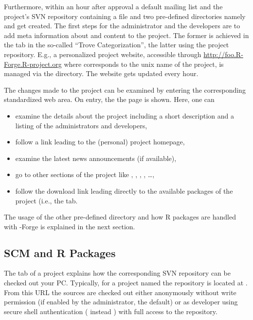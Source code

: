 Furthermore, within an hour after approval a default mailing list and
the project's SVN repository containing a  file and two
pre-defined directories namely  and  get
created. The first steps for the administrator and the developers
are to add meta information about and content to the project. The
former is achieved in the  tab in the so-called ``Trove
Categorization'', the latter using the project repository. E.g., a
personalized project website, accessible through
\url{http://foo.R-Forge.R-project.org} where  
corresponds to the unix name of the project, is managed via the
 directory. The website gets updated every hour. 

The changes made to the project can be examined by entering the
corresponding standardized web area. On entry, the the 
page is shown. Here, one can 

\begin{itemize}
\item examine the details about the project including a short
  description and a listing of the administrators and developers,
\item follow a link leading to the (personal) project homepage,
\item examine the latest news announcements (if available),
\item go to other sections of the project like
  , ,
   , , \ldots{},
\item follow the download link leading directly to the available
  packages of the project (i.e., the  tab.
\end{itemize}

The usage of the other pre-defined directory  and how R
packages are handled with \R-Forge is explained in the next
section. 


\subsection{SCM and R Packages}

The  tab of a project explains how the corresponding SVN
repository can be checked out your
PC. Typically, for a project named  the repository is
located at . From
this URL the sources are checked out either 
anonymously without write permission (if enabled by the
administrator, the default) or as developer using secure shell
authentication ( instead ) with full
access to the repository.

